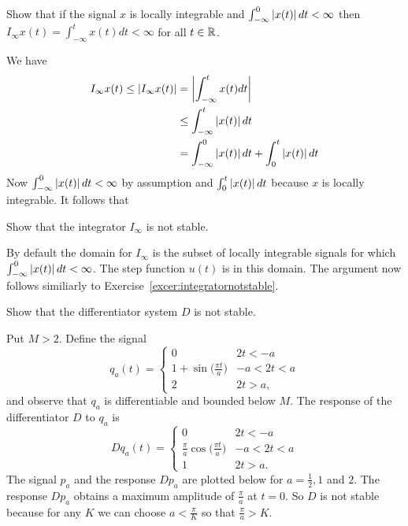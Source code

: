 \begin{excersizelist}
\item \label{excer:domainintegrator} Show that if the signal $x$ is locally integrable and $\int_{-\infty}^0\left\vert x(t) \right\vert dt < \infty$ then $I_\infty x(t) = \int_{-\infty}^t x(t) dt < \infty$ for all $t \in {\mathbb R}$.
\begin{solution}
We have
\begin{align*}
I_\infty x(t) \leq \left\vert I_\infty x(t) \right\vert &= \left\vert \int_{-\infty}^t x(t)dt  \right\vert \\
&\leq \int_{-\infty}^t \left\vert x(t) \right\vert dt \\
&= \int_{-\infty}^0 \left\vert x(t) \right\vert dt + \int_{0}^t \left\vert x(t) \right\vert dt
\end{align*}
Now $\int_{-\infty}^0 \left\vert x(t) \right\vert dt < \infty$ by assumption and $\int_{0}^t \left\vert x(t) \right\vert dt$ because $x$ is locally integrable.  It follows that 
\end{solution}

\item \label{excer:integratornotstable} Show that the integrator $I_\infty$ is not stable.
\begin{solution}
By default the domain for $I_\infty$ is the subset of locally integrable signals for which $\int_{-\infty}^0\left\vert x(t) \right\vert dt < \infty$.  The step function $u(t)$ is in this domain.  The argument now follows similiarly to Exercise~\ref{excer:integratornotstable}.
\end{solution}

\item \label{excer:diffnotstable} Show that the differentiator system $D$ is not  stable.
\begin{solution}
Put $M > 2$.  Define the signal
\[
q_a(t) = \begin{cases}
0 & 2t < -a \\
1 + \sin\big(\tfrac{\pi t}{a}\big) & -a < 2t < a \\
2 & 2t > a,
\end{cases}
\]
and observe that $q_a$ is differentiable and bounded below $M$.  The response of the differentiator $D$ to $q_a$ is
\[
Dq_a(t) = \begin{cases}
0 & 2t < -a \\
\tfrac{\pi}{a} \cos\big(\tfrac{\pi t}{a}\big) & -a < 2t < a \\
1 & 2t > a.
\end{cases}
\]
The signal $p_a$ and the response $Dp_a$ are plotted below for $a = \tfrac{1}{2},1$ and $2$.  The response $Dp_a$ obtains a maximum amplitude of $\tfrac{\pi}{a}$ at $t=0$.  So $D$ is not stable because for any $K$ we can choose $a < \tfrac{\pi}{K}$ so that $\tfrac{\pi}{a} > K$.


\end{solution}
\end{excersizelist}
